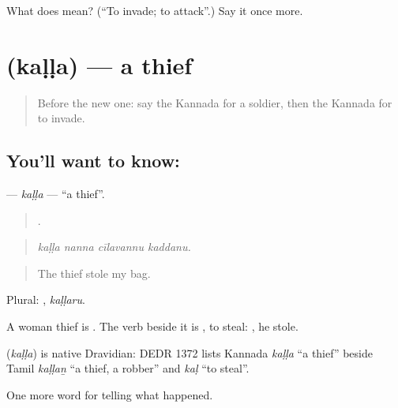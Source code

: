 \begin{tcolorbox}[breakable,colback=teal!4,colframe=teal!35!black,title={Before you move on}]
What does  mean? (\textquotedblleft{}To invade; to attack\textquotedblright{}.) Say it once more.
\end{tcolorbox}
\section[\texorpdfstring{\kn{ಕಳ್ಳ} (kaḷḷa)}{ಕಳ್ಳ (kaḷḷa)}]{ (kaḷḷa) — a thief}

\label{lesson:KA-C319-kalla}



\begin{quote}
Before the new one: say the Kannada for a soldier, then the Kannada for to invade.
\end{quote}

\subsection*{You'll want to know: }
\textbf{} — \emph{kaḷḷa} — \textquotedblleft{}a thief\textquotedblright{}.

\begin{quote}
   .
\end{quote}

\begin{quote}
\emph{kaḷḷa nanna cīlavannu kaddanu.}
\end{quote}

\begin{quote}
The thief stole my bag.
\end{quote}

Plural: , \emph{kaḷḷaru}.

A woman thief is . The verb beside it is , to steal: , he stole.

\begin{cousinweb}
\textbf{} (\emph{kaḷḷa}) is native Dravidian: DEDR 1372 lists Kannada \emph{kaḷḷa} \textquotedblleft{}a thief\textquotedblright{} beside Tamil \emph{kaḷḷaṉ} \textquotedblleft{}a thief, a robber\textquotedblright{} and \emph{kaḷ} \textquotedblleft{}to steal\textquotedblright{}.
\end{cousinweb}

\begin{grammarlens}[title={What you've built}]
One more word for telling what happened.
\end{grammarlens}

